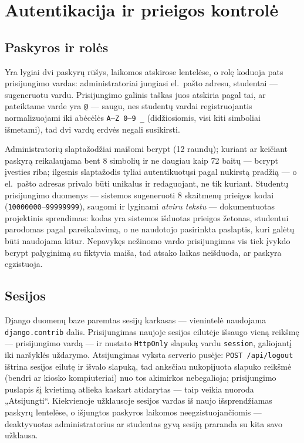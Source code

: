 \documentclass[11pt,a4paper]{article}
\newcommand{\code}[1]{\texttt{#1}}
\begin{document}
\section{Autentikacija ir prieigos kontrolė}
\label{sec:auth}

\subsection{Paskyros ir rolės}

Yra lygiai dvi paskyrų rūšys, laikomos atskirose lentelėse, o rolę
koduoja pats prisijungimo vardas: administratoriai jungiasi el.~pašto
adresu, studentai — sugeneruotu vardu. Prisijungimo galinis taškas
juos atskiria pagal tai, ar pateiktame varde yra \code{@} — saugu,
nes studentų vardai registruojantis normalizuojami iki abėcėlės
\code{A--Z 0--9 \_} (didžiosiomis, visi kiti simboliai išmetami), tad
dvi vardų erdvės negali susikirsti.

Administratorių slaptažodžiai maišomi bcrypt (12 raundų); kuriant ar
keičiant paskyrą reikalaujama bent 8 simbolių ir ne daugiau kaip 72
baitų — bcrypt įvesties riba; ilgesnis slaptažodis tyliai
autentikuotųsi pagal nukirstą pradžią — o el.~pašto adresas privalo
būti unikalus ir redaguojant, ne tik kuriant. Studentų prisijungimo
duomenys — sistemos sugeneruoti 8 skaitmenų prieigos kodai
(\code{10000000}--\code{99999999}), saugomi ir lyginami
\emph{atviru tekstu} — dokumentuotas projektinis sprendimas: kodas
yra sistemos išduotas prieigos žetonas, studentui parodomas pagal
pareikalavimą, o ne naudotojo pasirinkta paslaptis, kuri galėtų būti
naudojama kitur. Nepavykęs nežinomo vardo prisijungimas vis tiek
įvykdo bcrypt palyginimą su fiktyvia maiša, tad atsako laikas
neišduoda, ar paskyra egzistuoja.

\subsection{Sesijos}

Django duomenų baze paremtas sesijų karkasas — vienintelė naudojama
\code{django.contrib} dalis. Prisijungimas naujoje sesijos eilutėje
išsaugo vieną reikšmę — prisijungimo vardą — ir nustato \code{HttpOnly}
slapuką vardu \code{session}, galiojantį iki naršyklės uždarymo.
Atsijungimas vyksta serverio pusėje: \code{POST /api/logout} ištrina
sesijos eilutę ir išvalo slapuką, tad anksčiau nukopijuota slapuko
reikšmė (bendri ar kiosko kompiuteriai) nuo tos akimirkos nebegalioja;
prisijungimo puslapis šį kvietimą atlieka kaskart atidarytas — taip
veikia nuoroda „Atsijungti``. Kiekvienoje užklausoje sesijos vardas iš
naujo
išsprendžiamas paskyrų lentelėse, o išjungtos paskyros laikomos
neegzistuojančiomis — deaktyvuotas administratorius ar studentas
gyvą sesiją praranda su kita savo užklausa.
\end{document}
